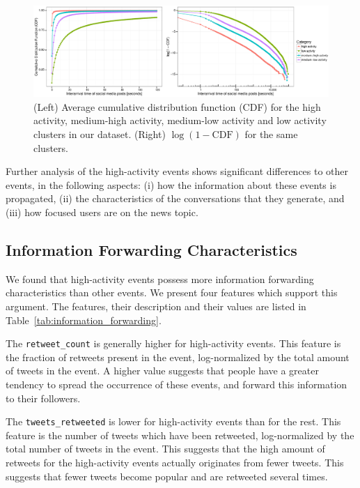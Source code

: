 \begin{figure}
  \centering
  \includegraphics[width=\textwidth]{figures/high-activity/fig6_log}
  \caption[Cumulative Distribution Functions of activity levels]{{(Left) Average
cumulative distribution function (CDF) for the high activity, medium-high
activity, medium-low activity and low activity clusters in our dataset. (Right)
$\log{(1 - \mathrm{CDF})}$ for the same clusters. 
    }}\label{fig:hi:cdf} %
\end{figure}



Further analysis of the high-activity events shows significant differences to
other events, in the following aspects: 
%
(i) how the information about these events is propagated, 
%
(ii) the characteristics of the conversations that they generate, and 
%
(iii) how focused users are on the news topic. 

\subsection{Information Forwarding Characteristics}
\label{subsec:info_forwarding}

We found that high-activity events possess more information forwarding
characteristics than other events. 
%
We present four features which support this argument. 
%
The features, their description and their values are listed in
Table~\ref{tab:information_forwarding}.

The \texttt{retweet\_count} is generally higher for high-activity events.
%
This feature is the fraction of retweets present in the event, log-normalized by
the total amount of tweets in the event. 
%
A higher value suggests that people have a greater tendency to spread the
occurrence of these events, and forward this information to their followers. 

The \texttt{tweets\_retweeted} is lower for high-activity events than for the
rest. 
%
This feature is the number of tweets which have been retweeted, log-normalized
by the total number of tweets in the event. 
%
This suggests that the high amount of retweets for the high-activity events
actually originates from fewer tweets. This suggests that fewer tweets become
popular and are retweeted several times.

